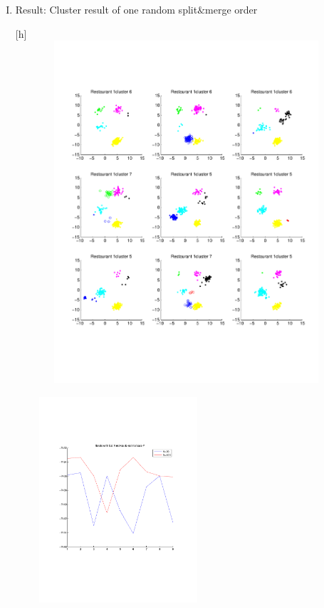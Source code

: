 \documentclass{article}
\begin{document}
\begin{spacing}{1.1}
\begin{enumerate}[(I)]
\item Result:
Cluster result of one random split$\&$merge order
\begin{center}[h] 
    \includegraphics[width=5in,height=5in]{sm_1.pdf}
\end{center}

\begin{center} 
    \includegraphics[width=3in,height=3in]{sm_com.pdf}
\end{center}


\end{enumerate}
\end{spacing}
\end{document}
